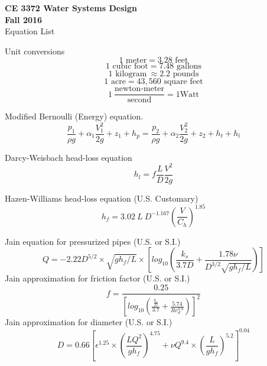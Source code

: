 \documentclass[11pt]{article}
\begin{document}
\begingroup
\begin{center}
{\textbf{{ CE 3372 Water Systems Design}  \\ Fall 2016} \\
Equation List}
\end{center}
\endgroup

Unit conversions\\
\begin{equation}
1\text{~meter} = 3.28\text{~feet}
\end{equation}
\begin{equation}
1\text{~cubic foot} = 7.48\text{~gallons}
\end{equation}
\begin{equation}
1\text{~kilogram} ~\approx 2.2\text{~pounds}
\end{equation}
\begin{equation}
1\text{~acre} = 43,560\text{~square feet}
\end{equation}
\begin{equation}
1~\frac{\text{newton-meter}}{\text{second}} = 1\text{Watt}
\end{equation}

Modified Bernoulli (Energy) equation.
\begin{equation}
\frac{p_1}{\rho g}+\alpha_1 \frac{V_1^2}{2g} + z_1 + h_p =
\frac{p_2}{\rho g}+\alpha_2 \frac{V_2^2}{2g} + z_2 + h_t + h_l
\end{equation}

Darcy-Weisbach head-loss equation
\begin{equation}
h_l=f \frac{L}{D}\frac{V^2}{2g}
\end{equation}

Hazen-Williams head-loss equation (U.S. Customary)
\begin{equation}
h_f = 3.02~ L~D^{-1.167} (\frac{V}{C_h})^{1.85}
\end{equation}

Jain equation for pressurized pipes (U.S. or S.I.)
\begin{equation}
Q=-2.22D^{5/2} \times \sqrt{gh_f/L}\times[log_{10} (\frac{k_s}{3.7D} + \frac{1.78\nu}{D^{3/2}\sqrt{gh_f/L}} )]
\end{equation}
Jain approximation for friction factor  (U.S. or S.I.)
\begin{equation}
f=\frac{0.25}{[log_{10} (\frac{\frac{k_e}{D}} {3.7} + \frac{5.74}{Re_d^{0.9} } )]  ^2}
\label{eqn:friction-factor-jain}
\end{equation}
Jain approximation for diameter  (U.S. or S.I.)
\begin{equation}
D=0.66[\epsilon^{1.25}\times(\frac{LQ^2}{gh_f})^{4.75}+\nu Q^{9.4}\times(\frac{L}{gh_f})^{5.2}]^{0.04}
\end{equation}
\end{document}
